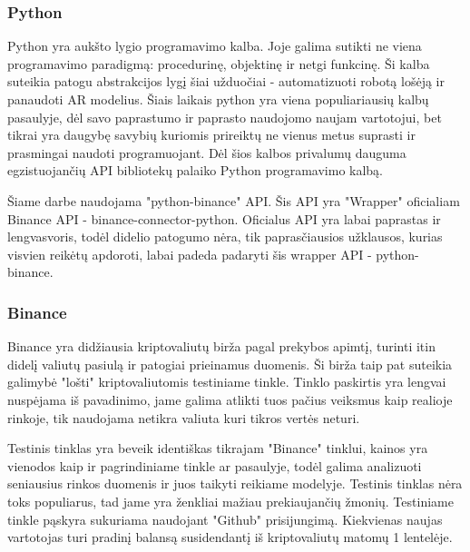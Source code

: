\documentclass{VUMIFInfKursinis}
\begin{document}
\subsubsection{Python}
Python yra aukšto lygio programavimo kalba. Joje galima sutikti ne viena programavimo paradigmą: procedurinę, objektinę ir netgi funkcinę.
Ši kalba suteikia patogu abstrakcijos lygį šiai užduočiai - automatizuoti robotą lošėją ir panaudoti AR modelius.
Šiais laikais python yra viena populiariausių kalbų pasaulyje, dėl savo paprastumo ir paprasto naudojomo naujam vartotojui, bet tikrai yra daugybę savybių
kuriomis prireiktų ne vienus metus suprasti ir prasmingai naudoti programuojant. Dėl šios kalbos privalumų dauguma egzistuojančių API
bibliotekų palaiko Python programavimo kalbą.


Šiame darbe naudojama "python-binance" API. Šis API yra "Wrapper" oficialiam Binance API - binance-connector-python. 
Oficialus API yra labai paprastas ir lengvasvoris, todėl didelio patogumo nėra, tik paprasčiausios užklausos,
kurias visvien reikėtų apdoroti, labai padeda padaryti šis wrapper API - python-binance.

\subsubsection{Binance}
Binance yra didžiausia kriptovaliutų birža pagal prekybos apimtį, turinti itin didelį valiutų pasiulą ir patogiai prieinamus duomenis. Ši birža taip pat
suteikia galimybė "lošti" kriptovaliutomis testiniame tinkle. Tinklo paskirtis yra lengvai nuspėjama iš pavadinimo, jame galima atlikti tuos pačius 
veiksmus kaip realioje rinkoje, tik naudojama netikra valiuta kuri tikros vertės neturi.

Testinis tinklas yra beveik identiškas tikrajam "Binance" tinklui, kainos yra vienodos kaip ir pagrindiniame tinkle ar pasaulyje, todėl galima analizuoti 
seniausius rinkos duomenis ir juos taikyti reikiame modelyje. Testinis tinklas nėra toks populiarus, tad jame yra ženkliai mažiau prekiaujančių žmonių. 
Testiniame tinkle pąskyra sukuriama naudojant "Github" prisijungimą. Kiekvienas naujas vartotojas turi pradinį balansą susidendantį iš kriptovaliutų
matomų 1 lentelėje.
\end{document}
